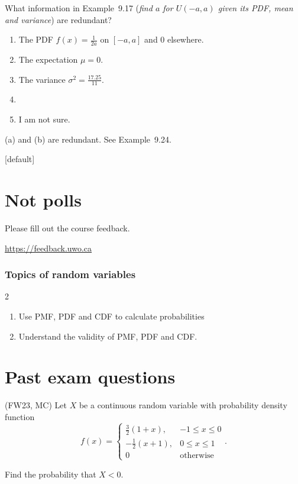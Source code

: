 \documentclass[aspectratio=169, t, 14pt]{beamer}
\begin{document}
\begin{frame}
  What information in Example~9.17 (\emph{find \(a\) for \(U(-a,a)\) given its PDF, mean and variance}) are redundant?

    \begin{enumerate}
      \item The PDF \(f(x) = \frac{1}{2a}\) on \([-a,a]\) and \(0\) elsewhere. 
      \item The expectation \(\mu = 0\). 
      \item The variance \(\sigma^{2} = \frac{17.25}{11}\).
      \item 
      \item I am not sure.
    \end{enumerate}

    \pause
    {\color{main} (a) and (b) are redundant. See Example~9.24.}
\end{frame}


[default]
\section{Not polls}

\begin{frame}[c]
  Please fill out the course feedback.

  \begin{center}

    \url{https://feedback.uwo.ca}
  \end{center}
\end{frame}

\begin{frame}
  \frametitle{Topics of random variables}

  \begin{multicols}{2}
    \begin{enumerate}
      \item Use PMF, PDF and CDF to calculate probabilities
      \item Understand the validity of PMF, PDF and CDF.
    \end{enumerate}
  \end{multicols}
\end{frame}


\section{Past exam questions}

\begin{frame}
  (FW23, MC) Let \(X\) be a continuous random variable with probability density function 
  \[
    f(x) = \begin{cases} \frac{3}{2}(1 + x), & -1 \le x \le 0 \\ -\frac{1}{2}(x + 1), & 0 \le x \le 1 \\ 0 & \text{otherwise}\end{cases}.
  \]

  Find the probability that \(X < 0\).
\end{frame}
\end{document}
